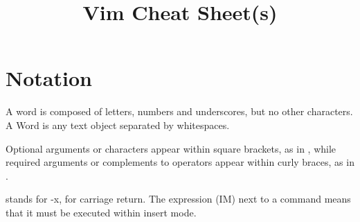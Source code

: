 \documentclass[a4paper,10pt]{amsart}
\begin{document}
\pagestyle{empty}
\title[]{Vim Cheat Sheet(s)}
\author{\href{https://github.com/pzuehlke}{}}
\maketitle

\section{Notation}\label{S:notation}
\thispagestyle{empty}

A word is composed of letters, numbers and underscores, but no other characters.
A Word is any text object separated by whitespaces. 

Optional arguments or
characters appear within square brackets, as in , while required
arguments or complements to operators appear within curly braces, as in
.

 stands for -x,  for carriage return. The
expression (IM) next to a command means that it must be executed within
insert mode. 

\end{document}
